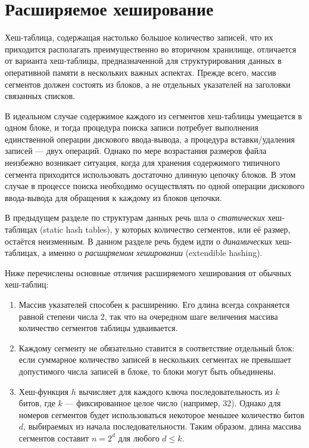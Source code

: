 

\section {Расширяемое хеширование}
\label{sec:ext-hashing}
Хеш-таблица, содержащая настолько большое количество записей, что их приходится располагать преимущественно во вторичном хранилище, отличается от варианта хеш-таблицы, предназначенной для структурирования данных в оперативной памяти в нескольких важных аспектах. Прежде всего, массив сегментов должен состоять из блоков, а не отдельных указателей на заголовки связанных списков.

В идеальном случае содержимое каждого из сегментов хеш-таблицы умещается в одном блоке, и тогда процедура поиска записи потребует выполнения единственной операции дискового ввода-вывода, а процедура вставки/удаления записей — двух операций. Однако по мере возрастания размеров файла неизбежно возникает ситуация, когда для хранения содержимого типичного сегмента приходится использовать достаточно длинную цепочку блоков. В этом случае в процессе поиска необходимо осуществлять по одной операции дискового ввода-вывода для обращения к каждому из блоков цепочки.

В предыдущем разделе по структурам данных речь шла о \emph{статических} хеш-таблицах (static hash tables), у которых количество сегментов, или её размер, остаётся неизменным. В данном разделе речь будем идти о \emph{динамических} хеш-таблицах, а именно о \emph{расширяемом хешировании} (extendible hashing).

Ниже перечислены основные отличия расширяемого хеширования от обычных хеш-таблиц:
\begin{enumerate}
  \item Массив указателей способен к расширению. Его длина всегда сохраняется равной степени числа 2, так что на очередном шаге величения массива количество сегментов таблицы удваивается.
  \item Каждому сегменту не обязательно ставится в соответствие отдельный блок: если суммарное количество записей в нескольких сегментах не превышает допустимого числа записей в блоке, то блоки могут быть объединены.
  \item Хеш-функция $h$ вычисляет для каждого ключа последовательность из $k$ битов, где $k$ — фиксированное целое число (например, 32). Однако для номеров сегментов будет использоваться некоторое меньшее количество битов $d$, выбираемых из начала последовательности. Таким образом, длина массива сегментов составит $n = 2^d$ для любого $d \leq k$.
\end{enumerate}

